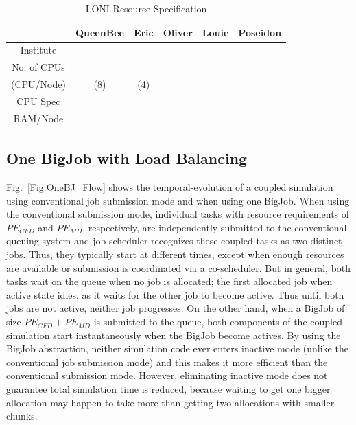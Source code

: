 \documentclass[conference,final]{IEEEtran}
\begin{document}
\setlength{\tabcolsep}{1pt}
\begin{table}[!ht]
\begin{center}

\caption{\small LONI Resource Specification}
\label{table:LONI_resource}

\begin{tabular}{ c || c | c | c | c | c}

\hline
 & QueenBee & Eric & Oliver & Louie & Poseidon \\
\hline
\hline
Institute &  &  &  &  & \\
\hline
No. of CPUs &  &  \\
(CPU/Node) & (8) & (4) \\
\hline
CPU Spec &  &  \\
\hline
RAM/Node &  &  \\
\hline

\end{tabular}

\end{center}
\end{table}

\subsection{One BigJob with Load Balancing}
Fig.~\ref{Fig:OneBJ_Flow} shows the temporal-evolution of a coupled simulation using
conventional job submission mode and when using one BigJob. When
using the conventional submission mode, individual tasks with resource requirements of $PE_{CFD}$ and $PE_{MD}$, respectively, are independently submitted to the conventional queuing system and job scheduler recognizes these coupled tasks as two distinct jobs. Thus, they typically start at different times, except when enough resources are available
or submission is coordinated via a co-scheduler. But in general,
both tasks wait on the queue when no job is allocated; the first allocated job when active state idles, as it waits for the other job to become active. Thus until both 
jobs are not active, neither job progresses.
On the other hand, when a BigJob of size $PE_{CFD}+PE_{MD}$ is submitted to the queue, both components of the coupled simulation start instantaneously when the BigJob become actives.  By using the BigJob abstraction, neither simulation code ever enters inactive mode (unlike the conventional job submission mode) and this makes it more efficient than the conventional submission mode.  However, eliminating inactive mode does not guarantee total simulation time is reduced, because waiting to get one bigger allocation may happen to take more than getting two allocations with smaller chunks. 
\end{document}
